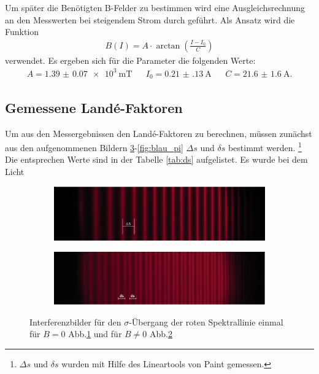 Um später die Benötigten B-Felder zu bestimmen wird eine Ausgleichsrechnung
an den Messwerten bei steigendem Strom durch geführt.
Als Ansatz wird die Funktion
\begin{align}
B(I)=A \cdot \arctan(\frac{I-I_0}{C}) \label{eqn:hyst}
\end{align}
verwendet.
Es ergeben sich für die Parameter die folgenden Werte:
\begin{align}
  A=\SI{1.39(7)e3}{\milli\tesla}&   &I_0=\SI{0.21(13)}{\ampere}&  &C=\SI{21.6(16)}{\ampere}.
\end{align}

\subsection{Gemessene Landé-Faktoren}
Um aus den Messergebnissen den
Landé-Faktoren zu berechnen, müssen zunächst aus den
aufgenommenen Bildern \ref{fig:rot}-\ref{fig:blau_pi} $\Delta s$ und $\delta s$ bestimmt werden.
\footnote{$\Delta s$ und $\delta s$ wurden mit Hilfe des Lineartools von Paint gemessen.}
Die entsprechen Werte sind in der Tabelle \ref{tab:ds}
aufgelistet. Es wurde bei dem  Licht

\begin{figure}
   \centering
   \begin{subfigure}{0.9\textwidth}
     \centering
     \includegraphics[width=1\textwidth]{rot_sigma_B=0.jpg}
     \caption{}
     \label{fig:rotB=0}
   \end{subfigure}
   \begin{subfigure}{0.9\textwidth}
     \centering
     \includegraphics[width=1\textwidth]{rot_sigma_B=!0.jpg}
     \caption{}
     \label{fig:rotB=!0}
   \end{subfigure}
\caption{Interferenzbilder für den $\sigma$-Übergang
 der roten Spektrallinie einmal für
 $B=0$ Abb.\ref{fig:rotB=0} und für $B\neq0$ Abb.\ref{fig:rotB=!0}}
\label{fig:rot}
\end{figure}
\FloatBarrier

